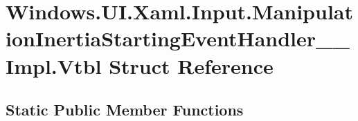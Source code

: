 \hypertarget{struct_windows_1_1_u_i_1_1_xaml_1_1_input_1_1_manipulation_inertia_starting_event_handler_____impl_1_1_vtbl}{}\section{Windows.\+U\+I.\+Xaml.\+Input.\+Manipulation\+Inertia\+Starting\+Event\+Handler\+\_\+\+\_\+\+Impl.\+Vtbl Struct Reference}
\label{struct_windows_1_1_u_i_1_1_xaml_1_1_input_1_1_manipulation_inertia_starting_event_handler_____impl_1_1_vtbl}
\subsection*{Static Public Member Functions}
